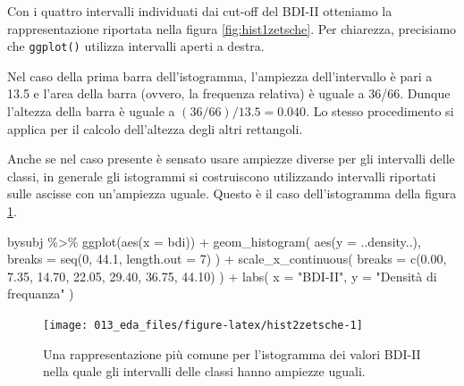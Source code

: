 \documentclass[
  11pt,
  italian,
  a4paper,
  extrafontsizes,onecolumn,openright
  ]{memoir}
\newenvironment{Shaded}{\begin{snugshade}}{\end{snugshade}}
\newcommand{\AttributeTok}[1]{\textcolor[rgb]{0.77,0.63,0.00}{#1}}
\newcommand{\DecValTok}[1]{\textcolor[rgb]{0.00,0.00,0.81}{#1}}
\newcommand{\FloatTok}[1]{\textcolor[rgb]{0.00,0.00,0.81}{#1}}
\newcommand{\FunctionTok}[1]{\textcolor[rgb]{0.00,0.00,0.00}{#1}}
\newcommand{\NormalTok}[1]{#1}
\newcommand{\SpecialCharTok}[1]{\textcolor[rgb]{0.00,0.00,0.00}{#1}}
\newcommand{\StringTok}[1]{\textcolor[rgb]{0.31,0.60,0.02}{#1}}
\theoremstyle{definition}
\theoremstyle{definition}
\theoremstyle{definition}
\theoremstyle{definition}
\theoremstyle{remark}
\begin{document}
Con i quattro intervalli individuati dai cut-off del BDI-II otteniamo la
rappresentazione riportata nella figura \ref{fig:hist1zetsche}. Per chiarezza, precisiamo che \texttt{ggplot()} utilizza intervalli aperti a destra.

Nel caso della prima barra dell'istogramma, l'ampiezza dell'intervallo è pari a 13.5 e l'area della barra (ovvero, la frequenza relativa) è uguale a 36/66. Dunque l'altezza della barra è uguale a \((36 / 66) / 13.5 = 0.040\). Lo stesso procedimento si applica per il calcolo dell'altezza degli altri rettangoli.

Anche se nel caso presente è sensato usare ampiezze diverse per gli intervalli delle classi, in generale gli istogrammi si costruiscono utilizzando intervalli riportati sulle ascisse con un'ampiezza uguale. Questo è il caso dell'istogramma della figura \ref{fig:hist2zetsche}.

\begin{Shaded}
\begin{Highlighting}[]
\NormalTok{bysubj }\SpecialCharTok{\%\textgreater{}\%}
  \FunctionTok{ggplot}\NormalTok{(}\FunctionTok{aes}\NormalTok{(}\AttributeTok{x =}\NormalTok{ bdi)) }\SpecialCharTok{+}
  \FunctionTok{geom\_histogram}\NormalTok{(}
    \FunctionTok{aes}\NormalTok{(}\AttributeTok{y =}\NormalTok{ ..density..),}
    \AttributeTok{breaks =} \FunctionTok{seq}\NormalTok{(}\DecValTok{0}\NormalTok{, }\FloatTok{44.1}\NormalTok{, }\AttributeTok{length.out =} \DecValTok{7}\NormalTok{)}
\NormalTok{  ) }\SpecialCharTok{+}
  \FunctionTok{scale\_x\_continuous}\NormalTok{(}
    \AttributeTok{breaks =} \FunctionTok{c}\NormalTok{(}\FloatTok{0.00}\NormalTok{, }\FloatTok{7.35}\NormalTok{, }\FloatTok{14.70}\NormalTok{, }\FloatTok{22.05}\NormalTok{, }
               \FloatTok{29.40}\NormalTok{, }\FloatTok{36.75}\NormalTok{, }\FloatTok{44.10}\NormalTok{)}
\NormalTok{  ) }\SpecialCharTok{+}
  \FunctionTok{labs}\NormalTok{(}
    \AttributeTok{x =} \StringTok{"BDI{-}II"}\NormalTok{,}
    \AttributeTok{y =} \StringTok{"Densità di frequanza"}
\NormalTok{  ) }
\end{Highlighting}
\end{Shaded}

\begin{figure}[h]

{\centering \texttt{[image: 013\_eda\_files/figure-latex/hist2zetsche-1]} 

}

\caption{Una rappresentazione più comune per l'istogramma dei valori BDI-II nella quale gli intervalli delle classi hanno ampiezze uguali.}\label{fig:hist2zetsche}
\end{figure}
\end{document}
